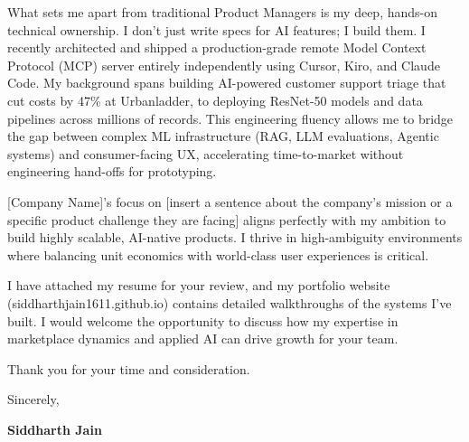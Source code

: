 \documentclass[a4paper,11pt]{article}
\begin{document}
What sets me apart from traditional Product Managers is my deep, hands-on technical ownership. I don't just write specs for AI features; I build them. I recently architected and shipped a production-grade remote Model Context Protocol (MCP) server entirely independently using Cursor, Kiro, and Claude Code. My background spans building AI-powered customer support triage that cut costs by 47\% at Urbanladder, to deploying ResNet-50 models and data pipelines across millions of records. This engineering fluency allows me to bridge the gap between complex ML infrastructure (RAG, LLM evaluations, Agentic systems) and consumer-facing UX, accelerating time-to-market without engineering hand-offs for prototyping.

[Company Name]'s focus on [insert a sentence about the company's mission or a specific product challenge they are facing] aligns perfectly with my ambition to build highly scalable, AI-native products. I thrive in high-ambiguity environments where balancing unit economics with world-class user experiences is critical.

I have attached my resume for your review, and my portfolio website (siddharthjain1611.github.io) contains detailed walkthroughs of the systems I've built. I would welcome the opportunity to discuss how my expertise in marketplace dynamics and applied AI can drive growth for your team.

Thank you for your time and consideration.

\vspace{0.5cm}

Sincerely,

\vspace{0.3cm}
\textbf{Siddharth Jain}
\end{document}
